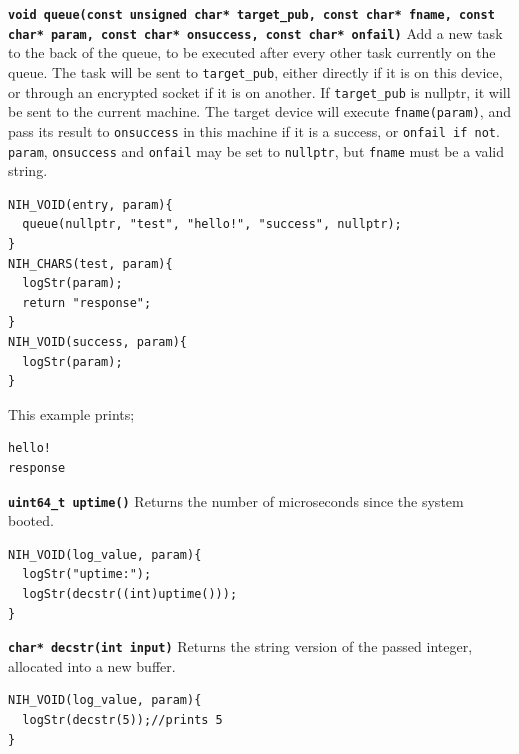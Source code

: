 \documentclass{article}
\begin{document}
\textbf{\texttt{void queue(const unsigned char* target\_pub, const char* fname, const char* param, const char* onsuccess, const char* onfail)}}\newline
Add a new task to the back of the queue, to be executed after every other task currently on the queue. The task will be sent to \texttt{target\_pub}, either directly if it is on this device, or through an encrypted socket if it is on another. If \texttt{target\_pub} is nullptr, it will be sent to the current machine. The target device will execute \texttt{fname(param)}, and pass its result to \texttt{onsuccess} in this machine if it is a success, or \texttt{onfail if not}. \texttt{param}, \texttt{onsuccess} and \texttt{onfail} may be set to \texttt{nullptr}, but \texttt{fname} must be a valid string.

\begin{tcolorbox}[colback=white,grow to left by=2.5mm,grow to right by=2.5mm,left*=0mm,right*=0mm,sharp corners]
\begin{verbatim}
NIH_VOID(entry, param){
  queue(nullptr, "test", "hello!", "success", nullptr);
}
NIH_CHARS(test, param){
  logStr(param);
  return "response";
}
NIH_VOID(success, param){
  logStr(param);
}
\end{verbatim}
\end{tcolorbox}
This example prints;
\begin{tcolorbox}[colback=white,grow to left by=2.5mm,grow to right by=2.5mm,left*=0mm,right*=0mm,sharp corners]
\begin{verbatim}
hello!
response
\end{verbatim}
\end{tcolorbox}

\textbf{\texttt{uint64\_t uptime()}}\newline
Returns the number of microseconds since the system booted.

\begin{tcolorbox}[colback=white,grow to left by=2.5mm,grow to right by=2.5mm,left*=0mm,right*=0mm,sharp corners]
\begin{verbatim}
NIH_VOID(log_value, param){
  logStr("uptime:");
  logStr(decstr((int)uptime()));
}
\end{verbatim}
\end{tcolorbox}

\textbf{\texttt{char* decstr(int input)}}\newline
Returns the string version of the passed integer, allocated into a new buffer.

\begin{tcolorbox}[colback=white,grow to left by=2.5mm,grow to right by=2.5mm,left*=0mm,right*=0mm,sharp corners]
\begin{verbatim}
NIH_VOID(log_value, param){
  logStr(decstr(5));//prints 5
}
\end{verbatim}
\end{tcolorbox}
\end{document}
